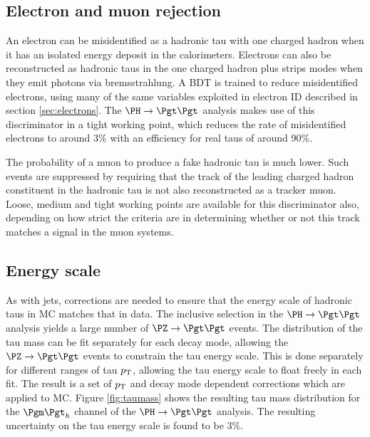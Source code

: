 \subsection{Electron and muon rejection}
\label{sec:tauleptonrejection}

An electron can be misidentified as a hadronic tau with one charged hadron when
it has an isolated energy deposit in the calorimeters. Electrons can also be
reconstructed as hadronic taus in the one charged hadron plus strips modes when 
they emit photons via bremsstrahlung. A \ac{BDT} is trained to reduce
misidentified electrons, using many of the same variables exploited in electron
ID described in section \ref{sec:electrons}. The $\PH\to\Pgt\Pgt$ analysis makes 
use of this discriminator in a tight working point, which reduces the rate 
of misidentified electrons to around $3\%$ with an efficiency for real taus of
around $90\%$. 

The probability of a muon to produce a fake hadronic tau is much lower. Such
events are suppressed by requiring that the track of the leading charged hadron
constituent in the hadronic tau is not also reconstructed as a tracker muon.
Loose, medium and tight working points are available for this discriminator
also, depending on how strict the criteria are in determining whether or not
this track matches a signal in the muon systems. 

\subsection{Energy scale}
\label{sec:taues}

As with jets, corrections are needed to ensure that the energy scale
of hadronic taus in \ac{MC} matches that in data. The inclusive selection in the
$\PH \to \Pgt\Pgt$ analysis yields a large number of $\ZToTauTau$ events. The
distribution of the tau mass can be fit separately for each decay mode, allowing
the $\ZToTauTau$ events to constrain the tau energy scale. This is done
separately for different ranges of tau $p_{\mathrm{T}}$, allowing the tau energy scale to
float freely in each fit. The result is a set of $p_{\mathrm{T}}$ and decay mode dependent
corrections which are applied to \ac{MC}. Figure \ref{fig:taumass} shows the
resulting tau mass distribution for the $\mutau$ channel of the $\PH\to\Pgt\Pgt$
analysis. The resulting uncertainty on the tau energy scale is found to be $3\%$.

